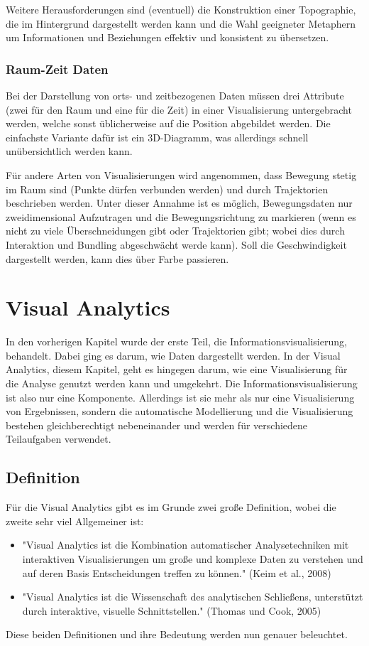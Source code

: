 			Weitere Herausforderungen sind (eventuell) die Konstruktion einer Topographie, die im Hintergrund dargestellt werden kann und die Wahl geeigneter Metaphern um Informationen und Beziehungen effektiv und konsistent zu übersetzen.

		\subsection{Raum-Zeit Daten}
			Bei der Darstellung von orts- und zeitbezogenen Daten müssen drei Attribute (zwei für den Raum und eine für die Zeit) in einer Visualisierung untergebracht werden, welche sonst üblicherweise auf die Position abgebildet werden. Die einfachste Variante dafür ist ein 3D-Diagramm, was allerdings schnell unübersichtlich werden kann.

			Für andere Arten von Visualisierungen wird angenommen, dass Bewegung stetig im Raum sind (\dh Punkte dürfen verbunden werden) und durch Trajektorien beschrieben werden. Unter dieser Annahme ist es möglich, Bewegungsdaten nur zweidimensional Aufzutragen und die Bewegungsrichtung zu markieren (wenn es nicht zu viele Überschneidungen gibt oder Trajektorien gibt; wobei dies durch Interaktion und Bundling abgeschwächt werde kann). Soll die Geschwindigkeit dargestellt werden, kann dies \bspw über Farbe passieren.

\chapter{Visual Analytics}
	In den vorherigen Kapitel wurde der erste Teil, die Informationsvisualisierung, behandelt. Dabei ging es darum, wie Daten dargestellt werden. In der Visual Analytics, diesem Kapitel, geht es hingegen darum, wie eine Visualisierung für die Analyse genutzt werden kann und umgekehrt. Die Informationsvisualisierung ist also nur eine Komponente. Allerdings ist sie mehr als nur eine Visualisierung von Ergebnissen, sondern die automatische Modellierung und die Visualisierung bestehen gleichberechtigt nebeneinander und werden für verschiedene Teilaufgaben verwendet.

	\section{Definition}
		Für die Visual Analytics gibt es im Grunde zwei große Definition, wobei die zweite sehr viel Allgemeiner ist:
		\begin{itemize}
			\item "Visual Analytics ist die Kombination automatischer Analysetechniken mit interaktiven Visualisierungen um große und komplexe Daten zu verstehen und auf deren Basis Entscheidungen treffen zu können." (Keim et al., 2008)
			\item "Visual Analytics ist die Wissenschaft des analytischen Schließens, unterstützt durch interaktive, visuelle Schnittstellen." (Thomas und Cook, 2005)
		\end{itemize}
		Diese beiden Definitionen und ihre Bedeutung werden nun genauer beleuchtet.

